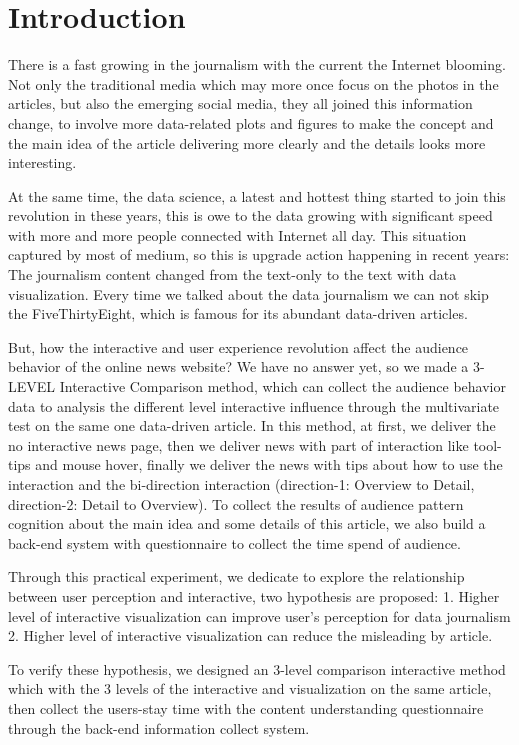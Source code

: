 \documentclass[9pt,journal,compsoc]{IEEEtran}
\begin{document}
\section{Introduction}
\large
There is a fast growing in the journalism with the current the Internet blooming. Not only the traditional media which may more once focus on the photos in the articles, but also the emerging social media, they all joined this information change, to involve more data-related plots and figures to make the concept and the main idea of the article delivering more clearly and the details looks more interesting.

At the same time, the data science, a latest and hottest thing started to join this revolution in these years, this is owe to the data growing with significant speed with more and more people connected with Internet all day. This situation captured by most of medium, so this is upgrade action happening in recent years: The journalism content changed from the text-only to the text with data visualization. Every time we talked about the data journalism we can not skip the FiveThirtyEight, which is famous for its abundant data-driven articles.

But, how the interactive and user experience revolution affect the audience behavior of the online news website? We have no answer yet, so we made a 3-LEVEL Interactive Comparison method, which can collect the audience behavior data to analysis the different level interactive influence through the multivariate test on the same one data-driven article. In this method, at first, we deliver the no interactive news page, then we deliver news with part of interaction like tool-tips and mouse hover, finally we deliver the news with tips about how to use the interaction and the bi-direction interaction (direction-1: Overview to Detail, direction-2: Detail to Overview). To collect the results of audience pattern cognition about the main idea and some details of this article, we also build a back-end system with questionnaire to collect the time spend of audience.

 Through this practical experiment, we dedicate to explore the relationship between user perception and interactive, two hypothesis are proposed:
 1. Higher level of interactive visualization can improve user's perception for data journalism
 2. Higher level of interactive visualization can reduce the misleading by article.
 
 To verify these hypothesis, we designed an 3-level comparison interactive method which with the 3 levels of the interactive and visualization on the same article, then collect the users-stay time with the content understanding questionnaire through the back-end information collect system. 
\end{document}
